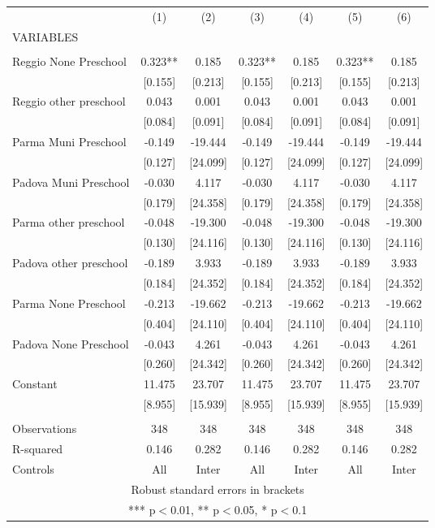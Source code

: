 \begin{tabular}{lcccccc} \hline
 & (1) & (2) & (3) & (4) & (5) & (6) \\
VARIABLES &  &  &  &  &  &  \\ \hline
 &  &  &  &  &  &  \\
Reggio None Preschool & 0.323** & 0.185 & 0.323** & 0.185 & 0.323** & 0.185 \\
 & [0.155] & [0.213] & [0.155] & [0.213] & [0.155] & [0.213] \\
Reggio other preschool & 0.043 & 0.001 & 0.043 & 0.001 & 0.043 & 0.001 \\
 & [0.084] & [0.091] & [0.084] & [0.091] & [0.084] & [0.091] \\
Parma Muni Preschool & -0.149 & -19.444 & -0.149 & -19.444 & -0.149 & -19.444 \\
 & [0.127] & [24.099] & [0.127] & [24.099] & [0.127] & [24.099] \\
Padova Muni Preschool & -0.030 & 4.117 & -0.030 & 4.117 & -0.030 & 4.117 \\
 & [0.179] & [24.358] & [0.179] & [24.358] & [0.179] & [24.358] \\
Parma other preschool & -0.048 & -19.300 & -0.048 & -19.300 & -0.048 & -19.300 \\
 & [0.130] & [24.116] & [0.130] & [24.116] & [0.130] & [24.116] \\
Padova other preschool & -0.189 & 3.933 & -0.189 & 3.933 & -0.189 & 3.933 \\
 & [0.184] & [24.352] & [0.184] & [24.352] & [0.184] & [24.352] \\
Parma None Preschool & -0.213 & -19.662 & -0.213 & -19.662 & -0.213 & -19.662 \\
 & [0.404] & [24.110] & [0.404] & [24.110] & [0.404] & [24.110] \\
Padova None Preschool & -0.043 & 4.261 & -0.043 & 4.261 & -0.043 & 4.261 \\
 & [0.260] & [24.342] & [0.260] & [24.342] & [0.260] & [24.342] \\
Constant & 11.475 & 23.707 & 11.475 & 23.707 & 11.475 & 23.707 \\
 & [8.955] & [15.939] & [8.955] & [15.939] & [8.955] & [15.939] \\
 &  &  &  &  &  &  \\
Observations & 348 & 348 & 348 & 348 & 348 & 348 \\
R-squared & 0.146 & 0.282 & 0.146 & 0.282 & 0.146 & 0.282 \\
 Controls & All & Inter & All & Inter & All & Inter \\ \hline
\multicolumn{7}{c}{ Robust standard errors in brackets} \\
\multicolumn{7}{c}{ *** p$<$0.01, ** p$<$0.05, * p$<$0.1} \\
\end{tabular}
